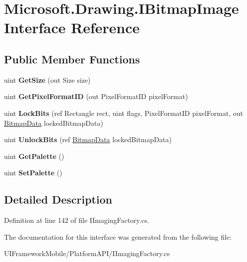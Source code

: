 \hypertarget{interface_microsoft_1_1_drawing_1_1_i_bitmap_image}{
\section{Microsoft.Drawing.IBitmapImage Interface Reference}
\label{interface_microsoft_1_1_drawing_1_1_i_bitmap_image}
}
\subsection*{Public Member Functions}
\begin{DoxyCompactItemize}
\item 
\hypertarget{interface_microsoft_1_1_drawing_1_1_i_bitmap_image_a99eb1588cd5f3a07110b172285a51838}{
uint {\bfseries GetSize} (out Size size)}
\label{interface_microsoft_1_1_drawing_1_1_i_bitmap_image_a99eb1588cd5f3a07110b172285a51838}

\item 
\hypertarget{interface_microsoft_1_1_drawing_1_1_i_bitmap_image_ae6991045b0fe9f388444992ccdd6f36f}{
uint {\bfseries GetPixelFormatID} (out PixelFormatID pixelFormat)}
\label{interface_microsoft_1_1_drawing_1_1_i_bitmap_image_ae6991045b0fe9f388444992ccdd6f36f}

\item 
\hypertarget{interface_microsoft_1_1_drawing_1_1_i_bitmap_image_a43a3763d90bdedf2bb837a6842543ad4}{
uint {\bfseries LockBits} (ref Rectangle rect, uint flags, PixelFormatID pixelFormat, out \hyperlink{struct_microsoft_1_1_drawing_1_1_bitmap_data}{BitmapData} lockedBitmapData)}
\label{interface_microsoft_1_1_drawing_1_1_i_bitmap_image_a43a3763d90bdedf2bb837a6842543ad4}

\item 
\hypertarget{interface_microsoft_1_1_drawing_1_1_i_bitmap_image_ab8cf3ae680f1c9c28425359a9f8751a5}{
uint {\bfseries UnlockBits} (ref \hyperlink{struct_microsoft_1_1_drawing_1_1_bitmap_data}{BitmapData} lockedBitmapData)}
\label{interface_microsoft_1_1_drawing_1_1_i_bitmap_image_ab8cf3ae680f1c9c28425359a9f8751a5}

\item 
\hypertarget{interface_microsoft_1_1_drawing_1_1_i_bitmap_image_a637a2107f4f1bc6ec8d12914cbf31926}{
uint {\bfseries GetPalette} ()}
\label{interface_microsoft_1_1_drawing_1_1_i_bitmap_image_a637a2107f4f1bc6ec8d12914cbf31926}

\item 
\hypertarget{interface_microsoft_1_1_drawing_1_1_i_bitmap_image_a12010f240d8fa72f31e807396a460f22}{
uint {\bfseries SetPalette} ()}
\label{interface_microsoft_1_1_drawing_1_1_i_bitmap_image_a12010f240d8fa72f31e807396a460f22}

\end{DoxyCompactItemize}


\subsection{Detailed Description}


Definition at line 142 of file IImagingFactory.cs.

The documentation for this interface was generated from the following file:\begin{DoxyCompactItemize}
\item 
UIFrameworkMobile/PlatformAPI/IImagingFactory.cs\end{DoxyCompactItemize}

